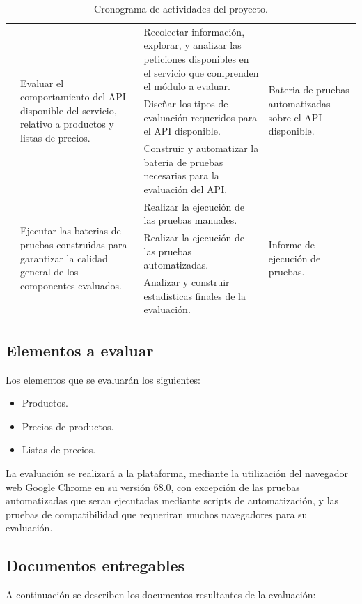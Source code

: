 \begin{table}
\begin{tabular}{|l|l|p{6.5cm}|l|}
\cline{2-4}
& \multirow{3}{4.0cm}{Evaluar el comportamiento del API disponible del servicio, relativo a productos y listas de precios.} &
Recolectar información, explorar, y analizar las peticiones disponibles en el servicio que comprenden el módulo a evaluar. &
\multirow{3}{4.0cm}{Bateria de pruebas automatizadas sobre el API disponible.} \\
\cline{3-3}
& & Diseñar los tipos de evaluación requeridos para el API disponible. & \\
\cline{3-3}
& & Construir y automatizar la bateria de pruebas necesarias para la evaluación del API. & \\
\cline{2-4}
& \multirow{3}{4.0cm}{Ejecutar las baterias de pruebas construidas para garantizar la calidad general de los componentes evaluados.} &
Realizar la ejecución de las pruebas manuales. &
\multirow{3}{4.0cm}{Informe de ejecución de pruebas.} \\
\cline{3-3}
& & Realizar la ejecución de las pruebas automatizadas. & \\
\cline{3-3}
& & Analizar y construir estadisticas finales de la evaluación. & \\
\hline
\end{tabular}
\caption{Cronograma de actividades del proyecto.}
\label{cronograma}
\end{table}

\subsection{Elementos a evaluar}
Los elementos que se evaluarán los siguientes:

\begin{itemize}
\item Productos.
\item Precios de productos.
\item Listas de precios.
\end{itemize}

La evaluación se realizará a la plataforma, mediante la utilización del navegador
web Google Chrome en su versión 68.0, con excepción de las pruebas automatizadas
que seran ejecutadas mediante scripts de automatización, y las pruebas de
compatibilidad que requeriran muchos navegadores para su evaluación.

\subsection{Documentos entregables}
A continuación se describen los documentos resultantes de la evaluación:

